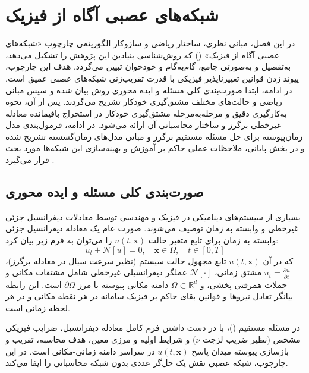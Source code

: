 \chapter{شبکه‌های عصبی آگاه از فیزیک}
\label{ch:method}

در این فصل، مبانی نظری، ساختار ریاضی و سازوکار الگوریتمی چارچوب «شبکه‌های عصبی آگاه از فیزیک» () که روش‌شناسی بنیادین این پژوهش را تشکیل می‌دهد، به‌تفصیل و به‌صورتی جامع، گام‌به‌گام و خودخوان تبیین می‌گردد. هدف این چارچوب، پیوند زدن قوانین تغییرناپذیر فیزیکی با قدرت تقریب‌زنی شبکه‌های عصبی عمیق است. در ادامه، ابتدا صورت‌بندی کلی مسئله و ایده محوری روش بیان شده و سپس مبانی ریاضی و حالت‌های مختلف مشتق‌گیری خودکار تشریح می‌گردند. پس از آن، نحوه به‌کارگیری دقیق و مرحله‌به‌مرحله مشتق‌گیری خودکار در استخراج باقیمانده معادله غیرخطی برگرز و ساختار محاسباتی آن ارائه می‌شود. در ادامه، فرمول‌بندی مدل زمان‌پیوسته برای حل مسئله مستقیم برگرز و مبانی مدل‌های زمان‌گسسته تشریح شده و در بخش پایانی، ملاحظات عملی حاکم بر آموزش و بهینه‌سازی این شبکه‌ها مورد بحث قرار می‌گیرد \cite{raissi2019}.

\section{صورت‌بندی کلی مسئله و ایده محوری}
\label{sec:formulation}

بسیاری از سیستم‌های دینامیکی در فیزیک و مهندسی توسط معادلات دیفرانسیل جزئی غیرخطی و وابسته به زمان توصیف می‌شوند. صورت عام یک معادله دیفرانسیل جزئی وابسته به زمان برای تابع متغیر حالت $u(t,\mathbf{x})$ را می‌توان به فرم زیر بیان کرد:
\begin{equation}
u_t + \mathcal{N}[u] = 0, \quad \mathbf{x} \in \Omega, \quad t \in [0,T]
\label{eq:general-pde}
\end{equation}
که در آن $u(t,\mathbf{x})$ تابع مجهول حالت سیستم (نظیر سرعت سیال در معادله برگرز)، $u_t = \frac{\partial u}{\partial t}$ مشتق زمانی، $\mathcal{N}[\cdot]$ عملگر دیفرانسیلی غیرخطی شامل مشتقات مکانی و جملات همرفتی-پخشی، و $\Omega \subset \mathbb{R}^d$ دامنه مکانی پیوسته با مرز $\partial\Omega$ است. این رابطه بیانگر تعادل نیروها و قوانین بقای حاکم بر فیزیک سامانه در هر نقطه مکانی و در هر لحظه زمانی است.

در مسئله مستقیم ()، با در دست داشتن فرم کامل معادله دیفرانسیل، ضرایب فیزیکی مشخص (نظیر ضریب لزجت $\nu$) و شرایط اولیه و مرزی معین، هدف محاسبه، تقریب و بازسازی پیوسته میدان پاسخ $u(t,\mathbf{x})$ در سراسر دامنه زمانی-مکانی است. در این چارچوب، شبکه عصبی نقش یک حل‌گر عددی بدون شبکه محاسباتی را ایفا می‌کند.

